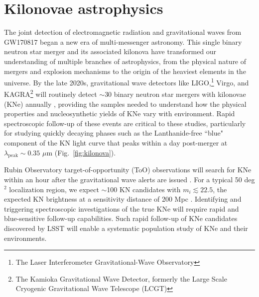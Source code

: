 \documentclass[11pt,a4paper,twoside,onecolumn,openany,final,oldfontcommands]{memoir}
\begin{document}
\section{Kilonovae astrophysics}

The joint detection of electromagnetic radiation and gravitational waves from GW170817 began a new era of multi-messenger astronomy.  This single binary neutron star merger and its associated kilonova have transformed our understanding of multiple branches of astrophysics, from the physical nature of mergers and explosion mechanisms to the origin of the heaviest elements in the universe.  By the late 2020s, gravitational wave detectors like LIGO,\footnote{The Laser Interferometer Gravitational-Wave Observatory} Virgo, and KAGRA\footnote{The Kamioka Gravitational Wave Detector, formerly the Large Scale Cryogenic Gravitational Wave Telescope (LCGT)} will routinely detect $\sim$30 binary neutron star mergers with kilonovae (KNe) annually \citep{abbott2018prospects}, providing the samples needed to understand how the physical properties and nucleosynthetic yields of KNe vary with environment.  Rapid spectroscopic follow-up of these events are critical to these studies, particularly for studying quickly decaying phases such as the Lanthanide-free ``blue" component of the KN light curve that peaks within a day post-merger at $\lambda_\mathrm{peak}\sim0.35$ $\mu$m (Fig.~\ref{fig:kilonova}).

Rubin Observatory target-of-opportunity (ToO) observations will search for KNe within an hour after the gravitational wave alerts are issued \citep[assuming the strategy proposed by][]{margutti2018}. For a typical 50 deg$^2$ localization region, we expect $\sim$100 KN candidates with $m_i\lesssim22.5$, the expected KN brightness at a sensitivity distance of 200 Mpc \citep{cowperthwaite2017, goldstein2019}. Identifying and triggering spectroscopic investigations of the true KNe will require rapid and blue-sensitive follow-up capabilities. Such rapid follow-up of KNe candidates discovered by LSST will enable a systematic population study of KNe and their environments.

\end{document}

